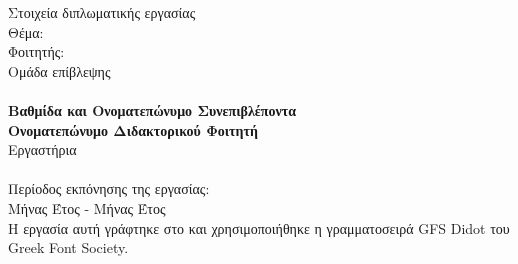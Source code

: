 \pagestyle{empty}
\begin{center}
\Large{Στοιχεία διπλωματικής εργασίας}\\[1cm]
{\large Θέμα:}
\textbf{\large \doctitle}\\[1cm]
\large {Φοιτητής: \textbf{\me}\\[1cm]
\large{Ομάδα επίβλεψης}\\
\textbf{\suptitle \, \supname}\\
\textbf{Βαθμίδα και Ονοματεπώνυμο Συνεπιβλέποντα}\\
\textbf{Ονοματεπώνυμο Διδακτορικού Φοιτητή}\\[1cm]
Εργαστήρια\\
\lab \\[1cm]
Περίοδος εκπόνησης της εργασίας:\\ Μήνας Έτος - Μήνας Έτος\\[1cm]
Η εργασία αυτή γράφτηκε στο \XeLaTeX{} και χρησιμοποιήθηκε η γραμματοσειρά GFS Didot του Greek Font Society.}
\end{center}